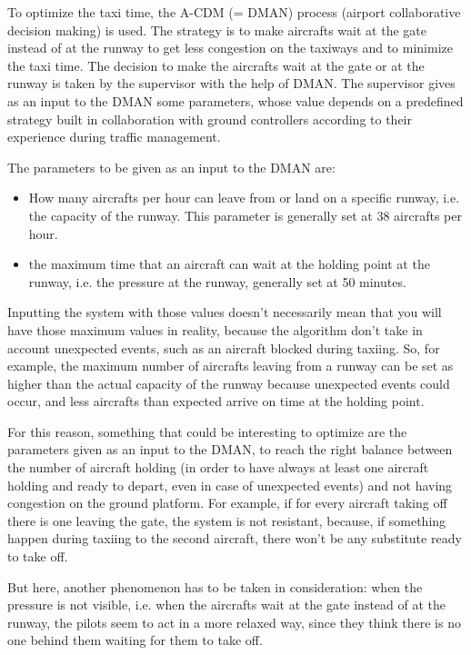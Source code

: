 \documentclass{article}
\begin{document}
To optimize the taxi time, the A-CDM (= DMAN) process (airport collaborative decision making) is used. The strategy is to make aircrafts wait at the gate instead of at the runway to get less congestion on the taxiways and to minimize the taxi time.
The decision to make the aircrafts wait at the gate or at the runway is taken by the supervisor with the help of DMAN. 
The supervisor gives as an input to the DMAN some parameters, whose value depends on a predefined strategy built in collaboration with ground controllers according to their experience during traffic management.

The parameters to be given as an input to the DMAN are:
\begin{itemize}
	\item How many aircrafts per hour can leave from or land on a specific runway, i.e. the capacity of the runway. This parameter is generally set at 38 aircrafts per hour.
	\item the maximum time that an aircraft can wait at the holding point at the runway, i.e. the pressure at the runway, generally set at 50 minutes.
\end{itemize}

Inputting the system with those values doesn't necessarily mean that you will have those maximum values in reality, because the algorithm don't take in account unexpected events, such as an aircraft blocked during taxiing. So, for example, the maximum number of aircrafts leaving from a runway can be set as higher than the actual capacity of the runway because unexpected events could occur, and less aircrafts than expected arrive on time at the holding point.

For this reason, something that could be interesting to optimize are the parameters given as an input to the DMAN, to reach the right balance between the number of aircraft holding (in order to have always at least one aircraft holding and ready to depart, even in case of unexpected events) and not having congestion on the ground platform.
For example, if for every aircraft taking off there is one leaving the gate, the system is not resistant, because, if something happen during taxiing to the second aircraft, there won't be any substitute ready to take off.

But here, another phenomenon has to be taken in consideration: when the pressure is not visible, i.e. when the aircrafts wait at the gate instead of at the runway, the pilots seem to act in a more relaxed way, since they think there is no one behind them waiting for them to take off.
\end{document}
